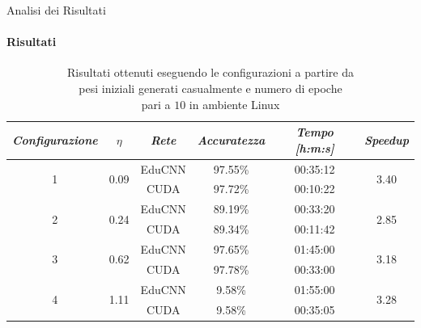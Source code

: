 \documentclass[
 ]{beamer}
\begin{document}
\begin{frame}{Analisi dei Risultati}
    \framesubtitle{Risultati}

        \begin{table}
            \centering
            \renewcommand\arraystretch{1.3}
            \small
            \begin{tabular}{| c | c | c | c | c | c |}
                \hline
                \emph{Configurazione} & $\eta$ & \emph{Rete} & \emph{Accuratezza} & \emph{Tempo [h:m:s]} & \emph{Speedup} \\
                \hline
                \multirow{2}{*}{1} & \multirow{2}{*}{0.09} & EduCNN & 97.55\% & 00:35:12 & \multirow{2}{*}{3.40} \\ \cline{3-5} 
                                   &                       & CUDA   & 97.72\% & 00:10:22 & \\
                \hline
                \multirow{2}{*}{2} & \multirow{2}{*}{0.24} & EduCNN & 89.19\% & 00:33:20 & \multirow{2}{*}{2.85} \\ \cline{3-5} 
                                   &                       & CUDA   & 89.34\% & 00:11:42 & \\
                \hline
                \multirow{2}{*}{3} & \multirow{2}{*}{0.62} & EduCNN & 97.65\% & 01:45:00 & \multirow{2}{*}{3.18} \\ \cline{3-5} 
                                   &                       & CUDA   & 97.78\% & 00:33:00 & \\
                \hline
                \multirow{2}{*}{4} & \multirow{2}{*}{1.11} & EduCNN & 9.58\% & 01:55:00 & \multirow{2}{*}{3.28} \\ \cline{3-5} 
                                   &                       & CUDA   & 9.58\% & 00:35:05 & \\
                \hline
            \end{tabular}
            \caption            
    {Risultati ottenuti eseguendo le configurazioni a partire da \\ pesi iniziali generati casualmente e numero di epoche \\ pari a $10$ in ambiente Linux \endtabular}                  
        \end{table}    
\end{frame}
\end{document}

